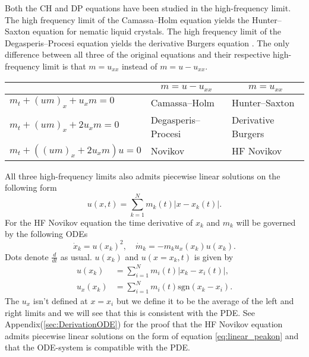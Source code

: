 \documentclass[english,master]{liumaiex}
\theoremstyle{plain}
\theoremstyle{definition}
\newcommand{\sgn}{\text{sgn}}
\begin{document}
Both the CH and DP equations have been studied in the high-frequency limit.  The high frequency limit of the Camassa--Holm equation yields the Hunter--Saxton equation \cite{HunterSaxton_1991,HunterZheng1994} for nematic liquid crystals. The high frequency limit of the Degasperis--Procesi equation yields the derivative Burgers equation \cite{Kohlenberg_2007, Lundmark_2008}.  The only difference between all three of the original equations and their respective high-frequency limit is that $m = u_{xx}$ instead of $m = u - u_{xx}$.
\begin{center}
  \begin{tabular}{l|c|c}
    & $m=u-u_{xx}$ & $m=u_{xx}$ \\
    \hline
    $m_t + (um)_x + u_xm = 0$ 
	& \multicolumn{1}{l|}{Camassa--Holm} & \multicolumn{1}{l}{Hunter--Saxton} \\
    \hline
    $m_t + (um)_x + 2u_xm = 0$ 
	& \multicolumn{1}{l|}{Degasperis--Procesi} & \multicolumn{1}{l}{Derivative Burgers} \\
    \hline
    $m_t + ((um)_x + 2u_xm)u = 0$ 
	& \multicolumn{1}{l|}{Novikov} & \multicolumn{1}{l}{HF Novikov} \\
  \end{tabular}
\end{center}

All three high-frequency limits also admits piecewise linear solutions on the following form
\begin{equation} \label{eq:linear_peakon}
	u(x, t) = \sum_{k = 1}^{N} m_k(t) |x - x_k(t)|.
\end{equation}
For the HF Novikov equation the time derivative of $x_k$ and $m_k$ will be governed by the following ODEs
\begin{equation} \label{eq:peakon_odes}
\dot{x}_k = u(x_k)^2, \quad
\dot{m}_k = -m_ku_x(x_k)u(x_k).
\end{equation}
Dots denote $\frac{d}{dt}$ as usual. $u(x_k)$ and $u(x = x_k,t)$ is given by
\begin{align}
	u(x_k) &= \sum_{i = 1}^{N} m_i(t) |x_k - x_i(t)|, \\
	u_x(x_k) &= \sum_{i = 1}^{N} m_i(t) \sgn(x_k - x_i).
\end{align}
The $u_x$ isn't defined at $x = x_i$ but we define it to be the average of the left and right limits and we will see that this is consistent with the PDE.  See Appendix(\ref{sec:DerivationODE}) for the proof that the HF Novikov equation admits piecewise linear solutions on the form of equation \eqref{eq:linear_peakon} and that the ODE-system is compatible with the PDE.
\end{document}
